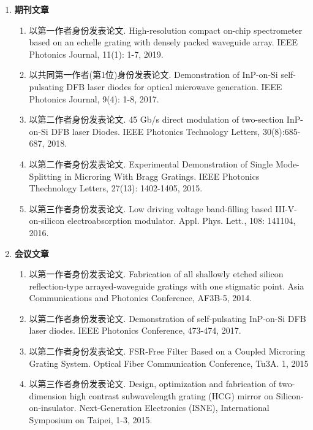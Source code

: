 \begin{publications}
\begin{enumerate}[]
	\item \textbf{期刊文章}
	\begin{enumerate}[1.]
		\item 以第一作者身份发表论文. High-resolution compact on-chip spectrometer based on an echelle grating with densely packed waveguide array. IEEE Photonics Journal, 11(1): 1-7, 2019.
		\item 以共同第一作者(第1位)身份发表论文. Demonstration of InP-on-Si self-pulsating DFB laser diodes for optical microwave generation. IEEE Photonics Journal, 9(4): 1-8, 2017.
		\item 以第二作者身份发表论文. 45 Gb/s direct modulation of two-section InP-on-Si DFB laser Diodes. IEEE Photonics Technology Letters, 30(8):685-687, 2018.
		\item 以第二作者身份发表论文. Experimental Demonstration of Single Mode-Splitting in Microring With Bragg Gratings. IEEE Photonics Thechnology Letters, 27(13): 1402-1405, 2015.
		\item 以第三作者身份发表论文. Low driving voltage band-filling based III-V-on-silicon electroabsorption modulator. Appl. Phys. Lett., 108: 141104, 2016.
		\end{enumerate}
	\item \textbf{会议文章}
	\begin{enumerate}[1.]
		\item 以第一作者身份发表论文. Fabrication of all shallowly etched silicon reflection-type arrayed-waveguide gratings with one stigmatic point. Asia Communications and Photonics Conference, AF3B-5, 2014.
		\item 以第二作者身份发表论文. Demonstration of self-pulsating InP-on-Si DFB laser diodes. IEEE Photonics Conference, 473-474, 2017.
		\item 以第二作者身份发表论文. FSR-Free Filter Based on a Coupled Microring Grating System. Optical Fiber Communication Conference, Tu3A. 1, 2015 
		\item 以第三作者身份发表论文. Design, optimization and fabrication of two-dimension high contrast subwavelength grating (HCG) mirror on Silicon-on-insulator. Next-Generation Electronics (ISNE), International Symposium on Taipei, 1-3, 2015.
		\end{enumerate}
\end{enumerate}
\end{publications}
